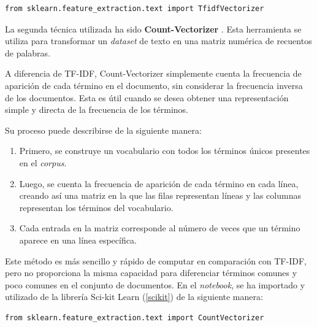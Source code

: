 \begin{center}
    \begin{mdframed}
    \scriptsize
            \begin{verbatim}
from sklearn.feature_extraction.text import TfidfVectorizer
            \end{verbatim}
    \end{mdframed}
\end{center}

La segunda técnica utilizada ha sido \textbf{Count-Vectorizer} \cite{scikit_count_vectorizer}. Esta herramienta se utiliza para transformar un \textit{dataset} de texto en una matriz numérica de recuentos de palabras.

A diferencia de \gls{TF}-\gls{IDF}, Count-Vectorizer simplemente cuenta la frecuencia de aparición de cada término en el documento, sin considerar la frecuencia inversa de los documentos. Esta es útil cuando se desea obtener una representación simple y directa de la frecuencia de los términos.

Su proceso puede describirse de la siguiente manera:

\begin{enumerate}
    \item Primero, se construye un vocabulario con todos los términos únicos presentes en el \textit{corpus}.
    \item Luego, se cuenta la frecuencia de aparición de cada término en cada línea, creando así una matriz en la que las filas representan líneas y las columnas representan los términos del vocabulario.
    \item Cada entrada en la matriz corresponde al número de veces que un término aparece en una línea específica.
\end{enumerate}

Este método es más sencillo y rápido de computar en comparación con \gls{TF}-\gls{IDF}, pero no proporciona la misma capacidad para diferenciar términos comunes y poco comunes en el conjunto de documentos. En el \textit{notebook}, se ha importado y utilizado de la librería Sci-kit Learn (\ref{scikit}) de la siguiente manera:

\begin{center}
    \begin{mdframed}
    \scriptsize
            \begin{verbatim}
from sklearn.feature_extraction.text import CountVectorizer
            \end{verbatim}
    \end{mdframed}
\end{center}

